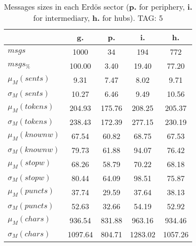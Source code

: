 \begin{table}[h!]
\begin{center}
\begin{tabular}{| l || c | c | c | c |}\hline
 & {\bf g.} & {\bf p.} & {\bf i.} & {\bf h.} \\\hline\hline
$msgs$ & 1000  & 34  & 194  & 772 \\
$msgs_{\%}$ & 100.00  & 3.40  & 19.40  & 77.20 \\\hline
$\mu_M(sents)$ & 9.31  & 7.47  & 8.02  & 9.71 \\
$\sigma_M(sents)$ & 10.27  & 6.46  & 9.49  & 10.56 \\\hline
$\mu_M(tokens)$ & 204.93  & 175.76  & 208.25  & 205.37 \\
$\sigma_M(tokens)$ & 238.43  & 172.39  & 277.15  & 230.19 \\\hline
$\mu_M(knownw)$ & 67.54  & 60.82  & 68.75  & 67.53 \\
$\sigma_M(knownw)$ & 79.73  & 61.88  & 94.07  & 76.42 \\\hline
$\mu_M(stopw)$ & 68.26  & 58.79  & 70.22  & 68.18 \\
$\sigma_M(stopw)$ & 80.44  & 64.09  & 98.51  & 75.87 \\\hline
$\mu_M(puncts)$ & 37.74  & 29.59  & 37.64  & 38.13 \\
$\sigma_M(puncts)$ & 52.63  & 32.66  & 54.19  & 52.92 \\\hline
$\mu_M(chars)$ & 936.54  & 831.88  & 963.16  & 934.46 \\
$\sigma_M(chars)$ & 1097.64  & 804.71  & 1283.02  & 1057.26 \\\hline
\end{tabular}
\caption{Messages sizes in each Erd\"os sector ({{\bf p.}} for periphery, {{\bf i.}} for intermediary, {{\bf h.}} for hubs). TAG: 5}
\end{center}
\end{table}
